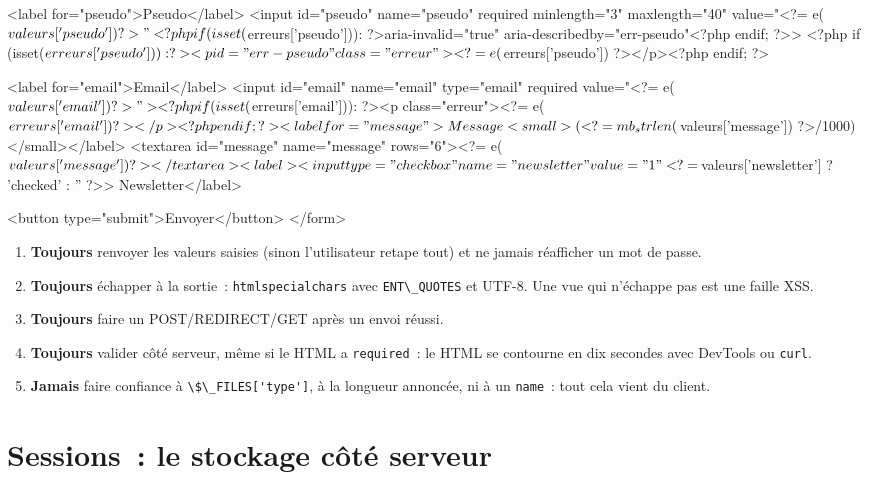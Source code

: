 \documentclass[12pt,a4paper,twoside,openright]{book}
\begin{document}
\begin{codephp}
  <label for="pseudo">Pseudo</label>
  <input id="pseudo" name="pseudo" required minlength="3" maxlength="40"
         value="<?= e($valeurs['pseudo']) ?>"
         <?php if (isset($erreurs['pseudo'])): ?>aria-invalid="true" aria-describedby="err-pseudo"<?php endif; ?>>
  <?php if (isset($erreurs['pseudo'])): ?><p id="err-pseudo" class="erreur"><?= e($erreurs['pseudo']) ?></p><?php endif; ?>

  <label for="email">Email</label>
  <input id="email" name="email" type="email" required value="<?= e($valeurs['email']) ?>">
  <?php if (isset($erreurs['email'])): ?><p class="erreur"><?= e($erreurs['email']) ?></p><?php endif; ?>

  <label for="message">Message <small>(<?= mb_strlen($valeurs['message']) ?>/1000)</small></label>
  <textarea id="message" name="message" rows="6"><?= e($valeurs['message']) ?></textarea>

  <label><input type="checkbox" name="newsletter" value="1" <?= $valeurs['newsletter'] ? 'checked' : '' ?>> Newsletter</label>

  <button type="submit">Envoyer</button>
</form>
\end{codephp}

\begin{enumerate}
  \item \textbf{Toujours} renvoyer les valeurs saisies (sinon l'utilisateur retape tout) et
        ne jamais r\'eafficher un mot de passe.
  \item \textbf{Toujours} \'echapper \`a la sortie~: \verb|htmlspecialchars| avec
        \verb|ENT\_QUOTES| et UTF-8. Une vue qui n'\'echappe pas est une faille XSS.
  \item \textbf{Toujours} faire un POST/REDIRECT/GET apr\`es un envoi r\'eussi.
  \item \textbf{Toujours} valider c\^ot\'e serveur, m\^eme si le HTML a \verb|required|~: le HTML se
        contourne en dix secondes avec DevTools ou \verb|curl|.
  \item \textbf{Jamais} faire confiance \`a \verb|\$\_FILES['type']|, \`a la longueur annonc\'ee, ni \`a
        un \verb|name|~: tout cela vient du client.
\end{enumerate}

\section{Sessions~: le stockage c\^ot\'e serveur}
\end{document}
